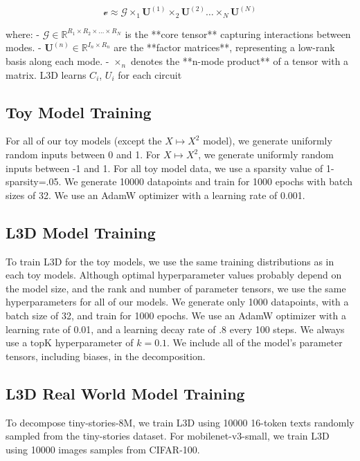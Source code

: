\documentclass{article}
\theoremstyle{plain}
\theoremstyle{definition}
\theoremstyle{remark}
\begin{document}
\begin{equation}
    \mathcal{v} \approx \mathcal{G} \times_1 \mathbf{U}^{(1)} \times_2 \mathbf{U}^{(2)} \dots \times_N \mathbf{U}^{(N)}
\end{equation}

where:
- \( \mathcal{G} \in \mathbb{R}^{R_1 \times R_2 \times \dots \times R_N} \) is the **core tensor** capturing interactions between modes.
- \( \mathbf{U}^{(n)} \in \mathbb{R}^{I_n \times R_n} \) are the **factor matrices**, representing a low-rank basis along each mode.
- \( \times_n \) denotes the **n-mode product** of a tensor with a matrix.
L3D learns $C_i$, {$U_i$} for each circuit


\subsection{Toy Model Training}\label{sec:toymodel_hyperparams}

For all of our toy models (except the $X \mapsto X^2$ model), we generate uniformly random inputs between 0 and 1. For $X \mapsto X^2$, we generate uniformly random inputs between -1 and 1. For all toy model data, we use a sparsity value of 1-sparsity=.05. We generate 10000 datapoints and train for 1000 epochs with batch sizes of 32. We use an AdamW optimizer with a learning rate of 0.001. 

\subsection{L3D Model Training}\label{sec:L3D_hyperparams}

To train L3D for the toy models, we use the same training distributions as in each toy models. Although optimal hyperparameter values probably depend on the model size, and the rank and number of parameter tensors, we use the same hyperparameters for all of our models. We generate only 1000 datapoints, with a batch size of 32, and train for 1000 epochs. We use an AdamW optimizer with a learning rate of 0.01, and a learning decay rate of .8 every 100 steps. We always use a $\text{topK}$ hyperparameter of $k=0.1$.  We include all of the model's parameter tensors, including biases, in the decomposition. 

\subsection{L3D Real World Model Training}\label{sec:realworld_hyperparams}

To decompose tiny-stories-8M, we train L3D using 10000 16-token texts randomly sampled from the tiny-stories dataset.  For mobilenet-v3-small, we train L3D using 10000 images samples from CIFAR-100.
\end{document}
